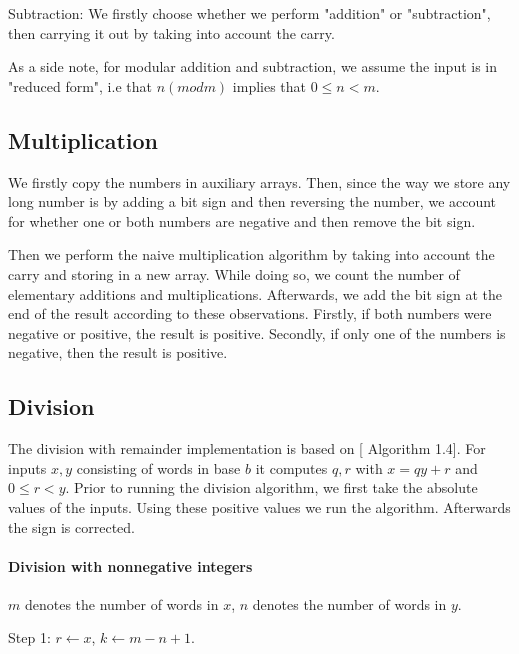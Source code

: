 \documentclass[a4paper]{article}
\begin{document}
Subtraction: We firstly choose whether we perform "addition"  or "subtraction", then carrying it out by taking into account the carry. 

As a side note, for modular addition and subtraction, we assume the input is in "reduced form", i.e that $n (mod m)$ implies that $0 \leq n < m.$


\subsection{Multiplication}

We firstly copy the numbers in auxiliary arrays. Then, since the way we store any long number is by adding a bit sign and then reversing the number, we account for whether one or both numbers are negative and then remove the bit sign. 

Then we perform the naive multiplication algorithm \cite{shoup} by taking into account the carry and storing in a new array. While doing so, we count the number of elementary additions and multiplications. Afterwards, we add the bit sign at the end of the result according to these observations. Firstly, if both numbers were negative or positive, the result is positive. Secondly, if only one of the numbers is negative, then the result is positive. 


\subsection{Division}

The division with remainder implementation is based on [\cite{ant} Algorithm 1.4].
For inputs $x, y$ consisting of words in base $b$ it computes $q, r$ with $x=qy+r$ and $0 \le r < y$.
Prior to running the division algorithm, we first take the absolute values of the inputs.
Using these positive values we run the algorithm.
Afterwards the sign is corrected.

\paragraph{Division with nonnegative integers}
$m$ denotes the number of words in $x$, $n$ denotes the number of words in $y$.

Step 1: $r \gets x$, $k \gets m - n + 1$.
\end{document}
